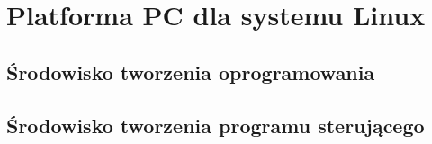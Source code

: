 \section{Platforma PC dla systemu Linux}
\subsection{Środowisko tworzenia oprogramowania}
\subsection{Środowisko tworzenia programu sterującego}